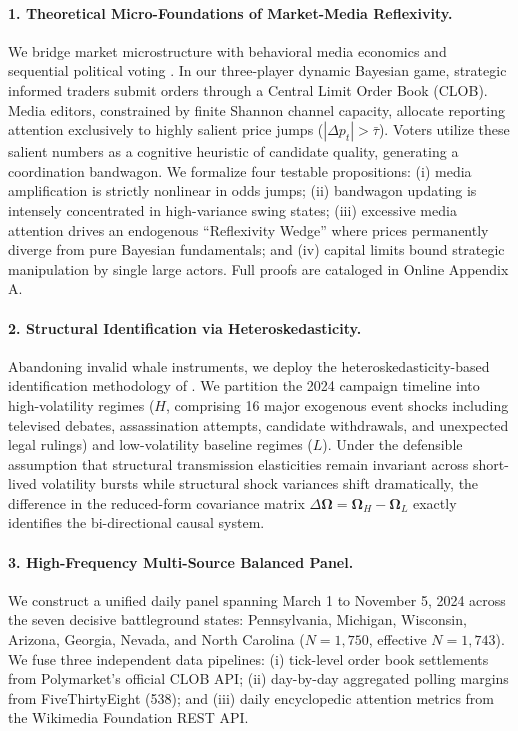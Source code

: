 \documentclass[12pt, a4paper]{article}
\begin{document}
\paragraph{1. Theoretical Micro-Foundations of Market-Media Reflexivity.}
We bridge market microstructure \citep{Kyle1985, GlostenMilgrom1985, EasleyOHara2004} with behavioral media economics \citep{Sims2003, Bordalo2013} and sequential political voting \citep{Callander2007}. In our three-player dynamic Bayesian game, strategic informed traders submit orders through a Central Limit Order Book (CLOB). Media editors, constrained by finite Shannon channel capacity, allocate reporting attention exclusively to highly salient price jumps ($|\Delta p_t| > \bar{\tau}$). Voters utilize these salient numbers as a cognitive heuristic of candidate quality, generating a coordination bandwagon. We formalize four testable propositions: (i) media amplification is strictly nonlinear in odds jumps; (ii) bandwagon updating is intensely concentrated in high-variance swing states; (iii) excessive media attention drives an endogenous ``Reflexivity Wedge'' where prices permanently diverge from pure Bayesian fundamentals; and (iv) capital limits bound strategic manipulation by single large actors. Full proofs are cataloged in Online Appendix A.

\paragraph{2. Structural Identification via Heteroskedasticity.}
Abandoning invalid whale instruments, we deploy the heteroskedasticity-based identification methodology of \citet{Rigobon2003}. We partition the 2024 campaign timeline into high-volatility regimes ($H$, comprising 16 major exogenous event shocks including televised debates, assassination attempts, candidate withdrawals, and unexpected legal rulings) and low-volatility baseline regimes ($L$). Under the defensible assumption that structural transmission elasticities remain invariant across short-lived volatility bursts while structural shock variances shift dramatically, the difference in the reduced-form covariance matrix $\Delta \mathbf{\Omega} = \mathbf{\Omega}_H - \mathbf{\Omega}_L$ exactly identifies the bi-directional causal system.

\paragraph{3. High-Frequency Multi-Source Balanced Panel.}
We construct a unified daily panel spanning March 1 to November 5, 2024 across the seven decisive battleground states: Pennsylvania, Michigan, Wisconsin, Arizona, Georgia, Nevada, and North Carolina ($N=1,750$, effective $N=1,743$). We fuse three independent data pipelines: (i) tick-level order book settlements from Polymarket's official CLOB API; (ii) day-by-day aggregated polling margins from FiveThirtyEight (538); and (iii) daily encyclopedic attention metrics from the Wikimedia Foundation REST API.
\end{document}
